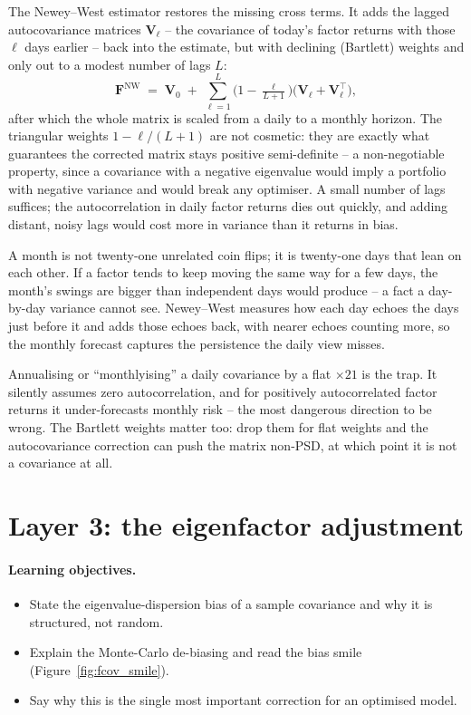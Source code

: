 \documentclass[11pt]{article}
\theoremstyle{definition}
\theoremstyle{plain}
\theoremstyle{remark}
\newcommand{\T}{^{\!\top}}
\newcommand{\Fmat}{\mathbf{F}}
\newcommand{\Vmat}{\mathbf{V}}
\begin{document}
The Newey--West estimator restores the missing cross terms. It adds the lagged autocovariance matrices $\Vmat_\ell$ -- the covariance of today's factor returns with those $\ell$ days earlier -- back into the estimate, but with declining (Bartlett) weights and only out to a modest number of lags $L$:
\[
\Fmat^{\text{NW}} \;=\; \Vmat_0 \;+\; \sum_{\ell=1}^{L}\Big(1-\tfrac{\ell}{L+1}\Big)\big(\Vmat_\ell + \Vmat_\ell\T\big),
\]
after which the whole matrix is scaled from a daily to a monthly horizon. The triangular weights $1-\ell/(L+1)$ are not cosmetic: they are exactly what guarantees the corrected matrix stays positive semi-definite -- a non-negotiable property, since a covariance with a negative eigenvalue would imply a portfolio with negative variance and would break any optimiser. A small number of lags suffices; the autocorrelation in daily factor returns dies out quickly, and adding distant, noisy lags would cost more in variance than it returns in bias.

\begin{intuition}
A month is not twenty-one unrelated coin flips; it is twenty-one days that lean on each other. If a factor tends to keep moving the same way for a few days, the month's swings are bigger than independent days would produce -- a fact a day-by-day variance cannot see. Newey--West measures how each day echoes the days just before it and adds those echoes back, with nearer echoes counting more, so the monthly forecast captures the persistence the daily view misses.
\end{intuition}

\begin{pitfall}
Annualising or ``monthlyising'' a daily covariance by a flat $\times 21$ is the trap. It silently assumes zero autocorrelation, and for positively autocorrelated factor returns it under-forecasts monthly risk -- the most dangerous direction to be wrong. The Bartlett weights matter too: drop them for flat weights and the autocovariance correction can push the matrix non-PSD, at which point it is not a covariance at all.
\end{pitfall}

\section{Layer 3: the eigenfactor adjustment}\label{sec:eigen}

\paragraph{Learning objectives.}
\begin{itemize}[leftmargin=1.4em,topsep=2pt]
  \item State the eigenvalue-dispersion bias of a sample covariance and why it is structured, not random.
  \item Explain the Monte-Carlo de-biasing and read the bias smile (Figure~\ref{fig:fcov_smile}).
  \item Say why this is the single most important correction for an optimised model.
\end{itemize}
\end{document}
